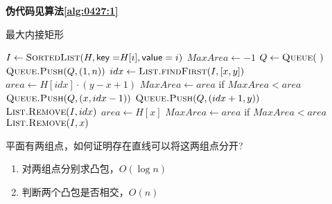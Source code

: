 \begin{questions}
\begin{solution}
        \textbf{伪代码见算法\ref{alg:0427:1}}
    \end{solution}

    \begin{algorithm}[!htp]
        \caption{最大内接矩形}\label{alg:0427:1}
        \begin{algorithmic}[1]
            \State $I \gets \Call{SortedList}{H, \mathsf{key=}H[i], \mathsf{value}=i}$
            \State $MaxArea \gets -1$
            \State $Q \gets \Call{Queue}{\ }$
            \State $\Call{Queue.Push}{Q, (1,n)}$
            \State $idx \gets \Call{List.findFirst}{I, [x,y]}$ 
            \State $area \gets H[idx] \cdot (y-x+1)$ 
            \State $MaxArea \gets area$ if $MaxArea < area$
            \State $\Call{Queue.Push}{Q,(x, idx-1)}$ 
            \State $\Call{Queue.Push}{Q,(idx+1, y)}$
            \State $\Call{List.Remove}{I, idx}$   
            \State $area \gets H[x]$ 
            \State $MaxArea \gets area$ if $MaxArea < area$
            \State $\Call{List.Remove}{I, x}$   
            \EndIf
            \EndWhile
        \end{algorithmic}
    \end{algorithm}

    \question 平面有两组点，如何证明存在直线可以将这两组点分开?
    \begin{solution}
        \begin{enumerate}
            \item 对两组点分别求凸包，$O(\log n)$
            \item 判断两个凸包是否相交，$O(n)$
        \end{enumerate}
    \end{solution}
\end{questions}
